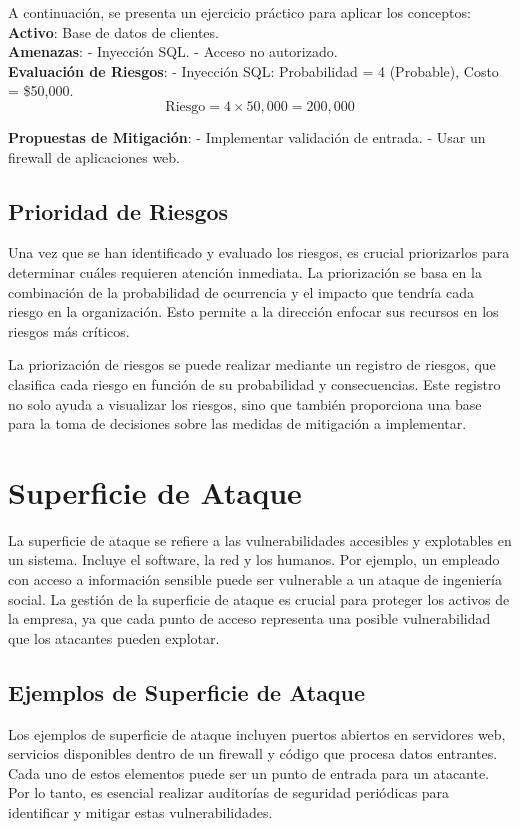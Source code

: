 A continuación, se presenta un ejercicio práctico para aplicar los conceptos: 
\textbf{Activo}: Base de datos de clientes.\\
\textbf{Amenazas}: 
- Inyección SQL.
- Acceso no autorizado.\\
\textbf{Evaluación de Riesgos}:
- Inyección SQL: Probabilidad = 4 (Probable), Costo = \$50,000.\\
\[
\text{Riesgo} = 4 \times 50,000 = 200,000
\]

\textbf{Propuestas de Mitigación}:
- Implementar validación de entrada.
- Usar un firewall de aplicaciones web.


\subsection{Prioridad de Riesgos}
Una vez que se han identificado y evaluado los riesgos, es crucial priorizarlos para determinar cuáles requieren atención inmediata. La priorización se basa en la combinación de la probabilidad de ocurrencia y el impacto que tendría cada riesgo en la organización. Esto permite a la dirección enfocar sus recursos en los riesgos más críticos.

La priorización de riesgos se puede realizar mediante un registro de riesgos, que clasifica cada riesgo en función de su probabilidad y consecuencias. Este registro no solo ayuda a visualizar los riesgos, sino que también proporciona una base para la toma de decisiones sobre las medidas de mitigación a implementar.




\section{Superficie de Ataque}
La superficie de ataque se refiere a las vulnerabilidades accesibles y explotables en un sistema. Incluye el software, la red y los humanos. Por ejemplo, un empleado con acceso a información sensible puede ser vulnerable a un ataque de ingeniería social. La gestión de la superficie de ataque es crucial para proteger los activos de la empresa, ya que cada punto de acceso representa una posible vulnerabilidad que los atacantes pueden explotar.

\subsection{Ejemplos de Superficie de Ataque}
Los ejemplos de superficie de ataque incluyen puertos abiertos en servidores web, servicios disponibles dentro de un firewall y código que procesa datos entrantes. Cada uno de estos elementos puede ser un punto de entrada para un atacante. Por lo tanto, es esencial realizar auditorías de seguridad periódicas para identificar y mitigar estas vulnerabilidades.

